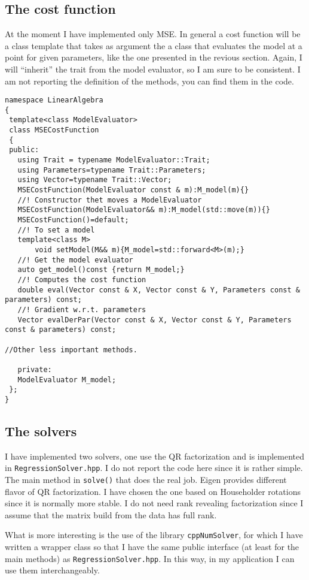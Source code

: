 \documentclass{article}
\newcommand{\li}{\lstinline}
\begin{document}
\subsection{The cost function}
At the moment I have implemented only MSE. In general a cost function
will be a class template that takes as argument the a class that evaluates the model at a point for given parameters, like the one
presented in the revious section.  Again, I will ``inherit'' the
trait from the model evaluator, so I am sure to be consistent.
I am not reporting the definition of the methods, you can find them in the code.
\begin{lstlisting}[title={MSECostFunction.hpp}]
  namespace LinearAlgebra
{
 template<class ModelEvaluator>
 class MSECostFunction
 {
 public:
   using Trait = typename ModelEvaluator::Trait;
   using Parameters=typename Trait::Parameters;
   using Vector=typename Trait::Vector;
   MSECostFunction(ModelEvaluator const & m):M_model(m){}
   //! Constructor thet moves a ModelEvaluator
   MSECostFunction(ModelEvaluator&& m):M_model(std::move(m)){}
   MSECostFunction()=default;
   //! To set a model
   template<class M>
       void setModel(M&& m){M_model=std::forward<M>(m);}
   //! Get the model evaluator
   auto get_model()const {return M_model;}
   //! Computes the cost function
   double eval(Vector const & X, Vector const & Y, Parameters const & parameters) const;
   //! Gradient w.r.t. parameters
   Vector evalDerPar(Vector const & X, Vector const & Y, Parameters const & parameters) const;

//Other less important methods.
   
   private:
   ModelEvaluator M_model;
 };
}
\end{lstlisting}
\subsection{The solvers}
I have implemented two solvers, one use the QR factorization and is
implemented in \texttt{RegressionSolver.hpp}. I do not report the code
here since it is rather simple. The main method in \li!solve()! that
does the real job. Eigen provides different flavor of QR
factorization. I have chosen the one based on Householder rotations
since it is normally more stable. I do not need rank revealing
factorization since I assume that the matrix build from the data has
full rank.

What is more interesting is the use of the library \texttt{cppNumSolver}, for which I have written a wrapper class
so that I have the same  public interface (at least for the main methods) as \texttt{RegressionSolver.hpp}. In this way, in my application I can use them interchangeably.
\end{document}
